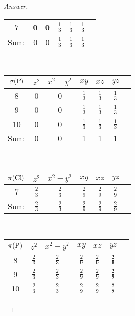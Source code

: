 \documentclass[../psets.tex]{subfiles}
\begin{document}
\begin{enumerate}[label={\Roman*)}]
\begin{enumerate}[label={\textbf{10.\arabic*}}]
\begin{proof}[Answer]
\begin{center}
\begin{tabular}{c|cccccc}
                    \hline
                    7 & 0 & 0 & $\frac{1}{3}$ & $\frac{1}{3}$ & $\frac{1}{3}$\\
                    \hline
                    Sum: & 0 & 0 & $\frac{1}{3}$ & $\frac{1}{3}$ & $\frac{1}{3}$\\
                \end{tabular}\\[1em]
                \hspace{-0.4pt}
                \begin{tabular}{c|cccccc}
                    $\sigma(\ce{P})$ & $z^2$ & $x^2-y^2$ & $xy$ & $xz$ & $yz$\\
                    \hline
                    8 & 0 & 0 & $\frac{1}{3}$ & $\frac{1}{3}$ & $\frac{1}{3}$\\
                    9 & 0 & 0 & $\frac{1}{3}$ & $\frac{1}{3}$ & $\frac{1}{3}$\\
                    10 & 0 & 0 & $\frac{1}{3}$ & $\frac{1}{3}$ & $\frac{1}{3}$\\
                    \hline
                    Sum: & 0 & 0 & 1 & 1 & 1\\
                \end{tabular}\\[1em]
                \begin{tabular}{c|cccccc}
                    $\pi(\ce{Cl})$ & $z^2$ & $x^2-y^2$ & $xy$ & $xz$ & $yz$\\
                    \hline
                    7 & $\frac{2}{3}$ & $\frac{2}{3}$ & $\frac{2}{9}$ & $\frac{2}{9}$ & $\frac{2}{9}$\\
                    \hline
                    Sum: & $\frac{2}{3}$ & $\frac{2}{3}$ & $\frac{2}{9}$ & $\frac{2}{9}$ & $\frac{2}{9}$\\
                \end{tabular}\\[1em]
                \hspace{-0.4pt}
                \begin{tabular}{c|cccccc}
                    $\pi(\ce{P})$ & $z^2$ & $x^2-y^2$ & $xy$ & $xz$ & $yz$\\
                    \hline
                    8 & $\frac{2}{3}$ & $\frac{2}{3}$ & $\frac{2}{9}$ & $\frac{2}{9}$ & $\frac{2}{9}$\\
                    9 & $\frac{2}{3}$ & $\frac{2}{3}$ & $\frac{2}{9}$ & $\frac{2}{9}$ & $\frac{2}{9}$\\
                    10 & $\frac{2}{3}$ & $\frac{2}{3}$ & $\frac{2}{9}$ & $\frac{2}{9}$ & $\frac{2}{9}$\\

\end{tabular}
\end{center}
\end{proof}
\end{enumerate}
\end{enumerate}
\end{document}
